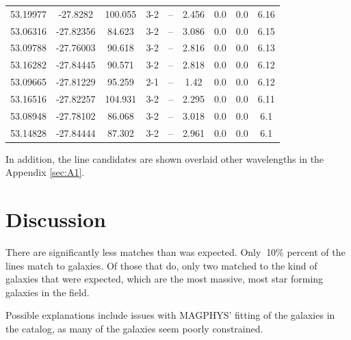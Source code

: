 \begin{table}
\begin{tabular}{ccccccccc}
53.19977 & -27.8282 & 100.055 & 3-2 & -- & 2.456 & 0.0 & 0.0 & 6.16 \\
53.06316 & -27.82356 & 84.623 & 3-2 & -- & 3.086 & 0.0 & 0.0 & 6.15 \\
53.09788 & -27.76003 & 90.618 & 3-2 & -- & 2.816 & 0.0 & 0.0 & 6.13 \\
53.16282 & -27.84445 & 90.571 & 3-2 & -- & 2.818 & 0.0 & 0.0 & 6.12 \\
53.09665 & -27.81229 & 95.259 & 2-1 & -- & 1.42 & 0.0 & 0.0 & 6.12 \\
53.16516 & -27.82257 & 104.931 & 3-2 & -- & 2.295 & 0.0 & 0.0 & 6.11 \\
53.08948 & -27.78102 & 86.068 & 3-2 & -- & 3.018 & 0.0 & 0.0 & 6.1 \\
53.14828 & -27.84444 & 87.302 & 3-2 & -- & 2.961 & 0.0 & 0.0 & 6.1 \\
\end{tabular}
\end{table}\label{table:Catalog}

In addition, the line candidates are shown overlaid other wavelengths in the Appendix \ref{sec:A1}.

\section{Discussion}

There are significantly less matches than was expected. Only $~$10\% percent of the lines match to galaxies. Of those that do, only two matched to the kind of galaxies that were expected, which are the most massive, most star forming galaxies in the field. 

Possible explanations include issues with MAGPHYS' fitting of the galaxies in the catalog, as many of the galaxies seem poorly constrained. 